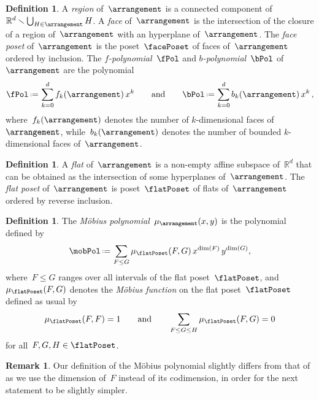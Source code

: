 \documentclass{amsart}
\newcommand{\darkblue}{\color{darkblue}} %
\theoremstyle{definition}
\newtheorem{definition}[theorem]{Definition}
\newtheorem{remark}[theorem]{Remark}
\newcommand{\R}{\mathbb{R}} %
\newcommand{\ssm}{\smallsetminus} %
\newcommand{\eqdef}{\mbox{\,\raisebox{0.2ex}{\scriptsize\ensuremath{\mathrm:}}\ensuremath{=}\,}} %
\newcommand{\defn}[1]{\textsl{\darkblue #1}} %
\begin{document}
\begin{definition}
A \defn{region} of~$\arrangement$ is a connected component of~$\R^d \ssm \bigcup_{H \in \arrangement} H$.
A \defn{face} of~$\arrangement$ is the intersection of the closure of a region of~$\arrangement$ with an hyperplane of~$\arrangement$.
The \defn{face poset} of~$\arrangement$ is the poset~$\facePoset$ of faces of~$\arrangement$ ordered by inclusion.
The \defn{$f$-polynomial}~$\fPol$ and \defn{$b$-polynomial}~$\bPol$ of~$\arrangement$ are the polynomial
\[
\fPol \eqdef \sum_{k = 0}^d f_k(\arrangement) \, x^k
\qquad\text{and}\qquad
\bPol \eqdef \sum_{k = 0}^d b_k(\arrangement) \, x^k \, ,
\]
where~$f_k(\arrangement)$ denotes the number of $k$-dimensional faces of~$\arrangement$, while~$b_k(\arrangement)$ denotes the number of bounded $k$-dimensional faces of~$\arrangement$.
\end{definition}

\begin{definition}
A \defn{flat} of~$\arrangement$ is a non-empty affine subspace of~$\R^d$ that can be obtained as the intersection of some hyperplanes of~$\arrangement$.
The \defn{flat poset} of~$\arrangement$ is poset~$\flatPoset$ of flats of~$\arrangement$ ordered by reverse inclusion.
\end{definition}

\begin{definition}
\label{def:MobiusPolynomial}
The \defn{M\"obius polynomial}~$\mu_{\arrangement}(x,y)$ is the polynomial defined by
\[
\mobPol \eqdef \sum_{F \le G} \mu_{\flatPoset}(F,G) \, x^{\dim(F)} \, y^{\dim(G)},
\]
where~$F \le G$ ranges over all intervals of the flat poset~$\flatPoset$, and~$\mu_{\flatPoset}(F,G)$ denotes the \defn{M\"obius function} on the flat poset~$\flatPoset$ defined as usual by
\[
\mu_{\flatPoset}(F, F) = 1
\qquad\text{and}\qquad
\sum_{F \le G \le H} \mu_{\flatPoset}(F,G) = 0
\]
for all~$F, G, H \in \flatPoset$.
\end{definition}

\begin{remark}
Our definition of the M\"obius polynomial slightly differs from that of \cite{Zaslavsky} as we use the dimension of~$F$ instead of its codimension, in order for the next statement to be slightly simpler.
\end{remark}
\end{document}
